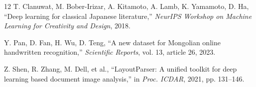 \documentclass[pdflatex,sn-mathphys-num]{sn-jnl}
\begin{document}
\begin{thebibliography}{12}
T. Clanuwat, M. Bober-Irizar, A. Kitamoto, A. Lamb, K. Yamamoto, D. Ha, ``Deep learning for classical Japanese literature,'' \emph{NeurIPS Workshop on Machine Learning for Creativity and Design}, 2018.

Y. Pan, D. Fan, H. Wu, D. Teng, ``A new dataset for Mongolian online handwritten recognition,'' \emph{Scientific Reports}, vol. 13, article 26, 2023.

Z. Shen, R. Zhang, M. Dell, et al., ``LayoutParser: A unified toolkit for deep learning based document image analysis,'' in \emph{Proc. ICDAR}, 2021, pp. 131--146.

\end{thebibliography}
\end{document}
